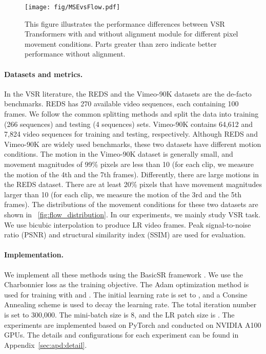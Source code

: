 \documentclass{article}
\begin{document}
\begin{figure}[t]
    \centering
    \texttt{[image: fig/MSEvsFlow.pdf]}
    \vspace{-5mm}
    \caption{This figure illustrates the performance differences between VSR Transformers with and without alignment module for different pixel movement conditions. Parts greater than zero indicate better performance without alignment.}
    \label{fig:mse_v_flow}
    \vspace{-6mm}
\end{figure}


\vspace{-4mm}
\paragraph{Datasets and metrics.}
\label{sec:exp_setup}
In the VSR literature, the REDS \cite{nah2019ntire} and the Vimeo-90K \cite{xue2019video} datasets are the de-facto benchmarks.
REDS has 270 available video sequences, each containing 100 frames.
We follow the common splitting methods and split the data into training (266 sequences) and testing (4 sequences) sets.
Vimeo-90K contains 64,612 and 7,824 video sequences for training and testing, respectively.
Although REDS and Vimeo-90K are widely used benchmarks, these two datasets have different motion conditions.
The motion in the Vimeo-90K dataset is generally small, and movement magnitudes of 99\% pixels are less than 10 (for each clip, we measure the motion of the 4th and the 7th frames).
Differently, there are large motions in the REDS dataset.
There are at least 20\% pixels that have movement magnitudes larger than 10 (for each clip, we measure the motion of the 3rd and the 5th frames).
The distributions of the movement conditions for these two datasets are shown in \figurename~\ref{fig:flow_distribution}.
In our experiments, we mainly study  VSR task.
We use bicubic interpolation to produce LR video frames.
Peak signal-to-noise ratio (PSNR) and structural similarity index (SSIM) are used for evaluation.



\vspace{-3mm}
\paragraph{Implementation.}
We implement all these methods using the BasicSR framework \cite{wang2020basicsr}.
We use the Charbonnier loss \cite{lai2017deep} as the training objective.
The Adam optimization \cite{kingma2014adam} method is used for training with  and . 
The initial learning rate is set to , and a Consine Annealing scheme \cite{loshchilov2016sgdr} is used to decay the learning rate.
The total iteration number is set to 300,000.
The mini-batch size is 8, and the LR patch size is .
The experiments are implemented based on PyTorch \cite{paszke2019pytorch} and conducted on NVIDIA A100 GPUs.
The details and configurations for each experiment can be found in Appendix~\ref{sec:apd:detail}.
\end{document}

